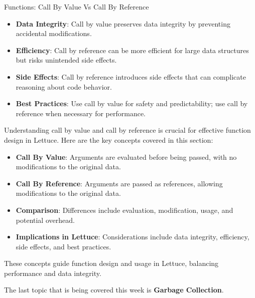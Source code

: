 \begin{notes}{Functions: Call By Value Vs Call By Reference}
\begin{highlight}
        \begin{itemize}
            \item \textbf{Data Integrity}: Call by value preserves data integrity by preventing accidental modifications.
            \item \textbf{Efficiency}: Call by reference can be more efficient for large data structures but risks unintended side effects.
            \item \textbf{Side Effects}: Call by reference introduces side effects that can complicate reasoning about code behavior.
            \item \textbf{Best Practices}: Use call by value for safety and predictability; use call by reference when necessary for performance.
        \end{itemize}
    
    \end{highlight}
    
    \begin{highlight}
    
        Understanding call by value and call by reference is crucial for effective function design in Lettuce. Here are the key concepts covered in this section:
    
        \begin{itemize}
            \item \textbf{Call By Value}: Arguments are evaluated before being passed, with no modifications to the original data.
            \item \textbf{Call By Reference}: Arguments are passed as references, allowing modifications to the original data.
            \item \textbf{Comparison}: Differences include evaluation, modification, usage, and potential overhead.
            \item \textbf{Implications in Lettuce}: Considerations include data integrity, efficiency, side effects, and best practices.
        \end{itemize}
    
        These concepts guide function design and usage in Lettuce, balancing performance and data integrity.
    
    \end{highlight}
\end{notes}

The last topic that is being covered this week is \textbf{Garbage Collection}.

